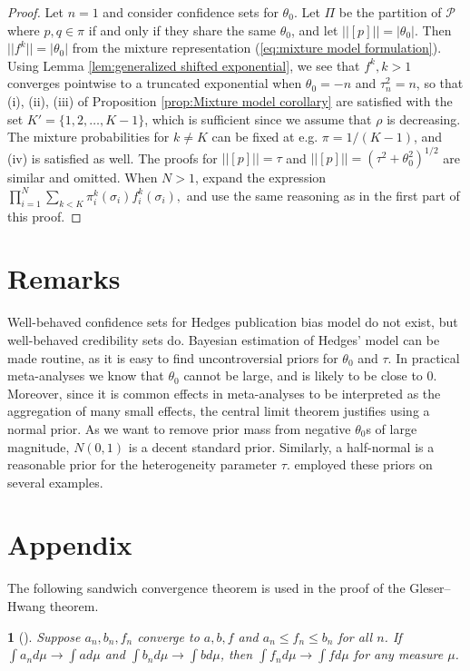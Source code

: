 \documentclass[article]{ajs}
\numberwithin{equation}{section}
\numberwithin{figure}{section}
\theoremstyle{plain}
\theoremstyle{definition}
\theoremstyle{definition}
\theoremstyle{plain}
\newtheorem{lem}[thm]{\protect\lemmaname}
\providecommand{\lemmaname}{Lemma}
\renewcommand{\sqrt}[1]{{(#1)^{1/2}}}
\begin{document}
\begin{proof}
\label{proof:general publication bias} Let $n=1$ and consider confidence sets for $\theta_{0}$. Let $\Pi$ be the partition of $\mathcal{P}$ where $p,q\in\pi$ if and only if they share the same $\theta_{0}$, and let $||[p]||=|\theta_{0}|$. Then $||f^{k}||=|\theta_{0}|$ from the mixture representation (\ref{eq:mixture model formulation}). Using Lemma \ref{lem:generalized shifted exponential}, we see that $f^{k},k>1$ converges pointwise to a truncated exponential when $\theta_{0}=-n$ and $\tau_n^{2} = n$, so that (i), (ii), (iii) of Proposition \ref{prop:Mixture model corollary} are satisfied with the set $K'=\{1,2,\ldots, K-1\}$, which is sufficient since we assume that $\rho$ is decreasing. The mixture probabilities for $k\neq K$ can be fixed at e.g. $\pi=1/(K-1)$, and (iv) is satisfied as well. The proofs for $||[p]||=\tau$ and $||[p]||=\sqrt{\tau^{2}+\theta_{0}^{2}}$ are similar and omitted. When $N>1$, expand the expression $\prod_{i=1}^{N}\sum_{k<K}\pi_{i}^{k}(\sigma_{i})f_{i}^{k}(\sigma_{i}),$ and use the same reasoning as in the first part of this proof.
\end{proof}



\section{Remarks}

Well-behaved confidence sets for Hedges publication bias model do
not exist, but well-behaved credibility sets do. Bayesian estimation
of Hedges' model can be made routine, as it is easy to find uncontroversial
priors for $\theta_{0}$ and $\tau$. In practical meta-analyses we
know that $\theta_{0}$ cannot be large, and is likely to be close
to $0$. Moreover, since it is common effects in meta-analyses to
be interpreted as the aggregation of many small effects, the central
limit theorem justifies using a normal prior. As we want to remove
prior mass from negative $\theta_{0}$s of large magnitude, $N(0,1)$
is a decent standard prior. Similarly, a half-normal is a reasonable
prior for the heterogeneity parameter $\tau$. \citet{moss2019modelling}
employed these priors on several examples. 

\section*{Appendix}

The following sandwich convergence theorem is used in the proof of
the Gleser--Hwang theorem. 
\begin{lem}[{\citet[Exercise 16.4(a)]{billingsley1995probability}}]
\label{lem:Dominated covergence theorem} Suppose $a_{n},b_{n},f_{n}$
converge to $a,b,f$ and $a_{n}\leq f_{n}\leq b_{n}$ for all $n$.
If $\int a_{n}d\mu\to\int ad\mu$ and $\int b_{n}d\mu\to\int bd\mu$,
then $\int f_{n}d\mu\to\int fd\mu$ for any measure $\mu$.
\end{lem}
\end{document}
